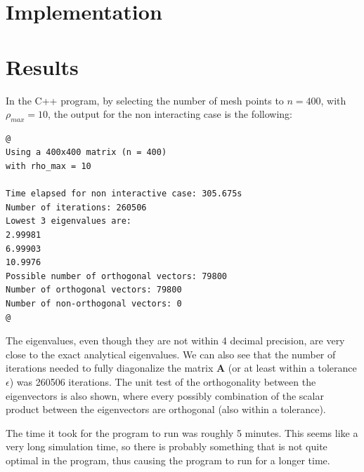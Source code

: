 \documentclass[12pt]{article}
\begin{document}
\section{Implementation}

\section{Results}
In the C++ program, by selecting the number of mesh points to $n=400$, with $\rho_{max} = 10$, the output for the non interacting case is the following:
\begin{lstlisting}
@
Using a 400x400 matrix (n = 400)
with rho_max = 10

Time elapsed for non interactive case: 305.675s
Number of iterations: 260506
Lowest 3 eigenvalues are: 
2.99981
6.99903
10.9976
Possible number of orthogonal vectors: 79800
Number of orthogonal vectors: 79800
Number of non-orthogonal vectors: 0
@
\end{lstlisting}
The eigenvalues, even though they are not within 4 decimal precision, are very close to the exact analytical eigenvalues. We can also see that the number of iterations needed to fully diagonalize the matrix $\mathbf{A}$ (or at least within a tolerance $\epsilon$) was 260506 iterations. The unit test of the orthogonality between the eigenvectors is also shown, where every possibly combination of the scalar product between the eigenvectors are orthogonal (also within a tolerance).

The time it took for the program to run was roughly 5 minutes. This seems like a very long simulation time, so there is probably something that is not quite optimal in the program, thus causing the program to run for a longer time.
\end{document}
